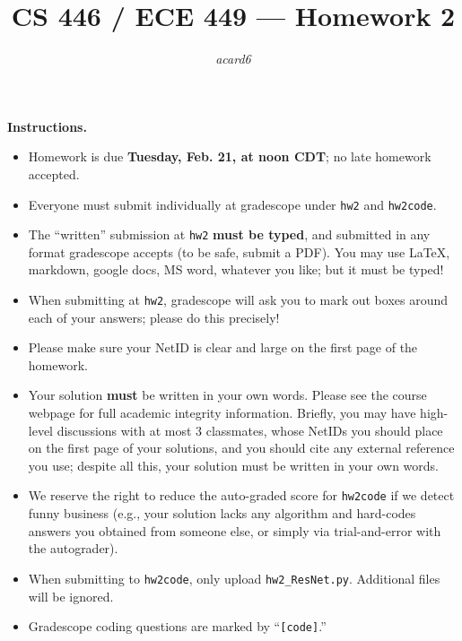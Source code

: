 \documentclass{article}
\title{CS 446 / ECE 449 --- Homework 2}
\author{\emph{acard6}}
\date{}
\theoremstyle{definition}
\theoremstyle{remark}
\begin{document}
	\maketitle
	
	\noindent\textbf{Instructions.}
	\begin{itemize}
		\item
		Homework is due \textbf{\color{red}Tuesday, Feb. 21, at noon CDT}; no late homework accepted.
		
		\item
		Everyone must submit individually at gradescope under \texttt{hw2} and \texttt{hw2code}.
		
		\item
		The ``written'' submission at \texttt{hw2} \textbf{must be typed}, and submitted in
		any format gradescope accepts (to be safe, submit a PDF).  You may use \LaTeX, markdown,
		google docs, MS word, whatever you like; but it must be typed!
		
		\item
		When submitting at \texttt{hw2}, gradescope will ask you to mark out boxes
		around each of your answers; please do this precisely!
		
		\item
		Please make sure your NetID is clear and large on the first page of the homework.
		
		\item
		Your solution \textbf{must} be written in your own words.
		Please see the course webpage for full academic integrity information.
		Briefly, you may have high-level discussions with at most 3 classmates,
		whose NetIDs you should place on the first page of your solutions,
		and you should cite any external reference you use; despite all this,
		your solution must be written in your own words.
		
		\item
		We reserve the right to reduce the auto-graded score for
		\texttt{hw2code} if we detect funny business (e.g., your solution
		lacks any algorithm and hard-codes answers you obtained from
		someone else, or simply via trial-and-error with the autograder).
		
		\item
		When submitting to \texttt{hw2code}, only upload \texttt{hw2\_ResNet.py}. Additional files will be ignored.
		
		\item
		Gradescope coding questions are marked by ``\texttt{[code]}.''
		
	\end{itemize}
	
\end{document}
